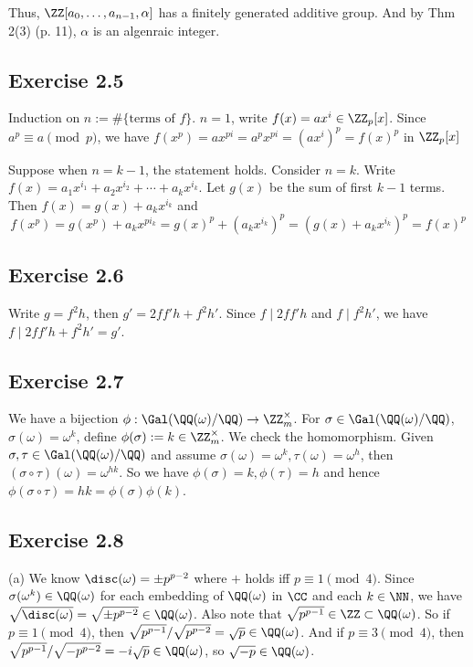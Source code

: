 \documentclass[../Chapter.tex]{subfiles}
\begin{document}
Thus, $\ZZ[a_0,\ldots,a_{n-1},\alpha]$ has a finitely generated additive group. And by Thm 2(3) (p. 11), $\alpha$ is an algenraic integer.  

\subsection*{Exercise 2.5}

Induction on $n:=\#\{\text{terms of }f\}$. $n=1$, write $f(x)=ax^i \in \ZZ_p[x]$. Since $a^p \equiv a \pmod{p}$, we have $f(x^p)=ax^{pi}=a^px^{pi}=(ax^i)^p=f(x)^p$ in $\ZZ_p[x]$

Suppose when $n=k-1$, the statement holds. Consider $n=k$. Write $f(x)=a_1x^{i_1}+a_2x^{i_2}+\cdots+a_kx^{i_k}$. Let $g(x)$ be the sum of first $k-1$ terms. Then $f(x)=g(x)+a_kx^{i_k}$ and $$f(x^p)=g(x^p)+a_kx^{pi_k}=g(x)^p+(a_kx^{i_k})^p=\left(g(x)+a_kx^{i_k}\right)^p=f(x)^p$$

\subsection*{Exercise 2.6}

Write $g=f^2h$, then $g'=2ff'h+f^2h'$. Since $f\mid 2ff'h$ and $f\mid f^2h'$, we have $f\mid 2ff'h+f^2h'=g'$.

\subsection*{Exercise 2.7}

We have a bijection $\phi: \Gal(\QQ(\omega)/\QQ)\to\ZZ_m^{\times}$. For $\sigma\in \Gal(\QQ(\omega)/\QQ)$, $\sigma(\omega)=\omega^k$, define $\phi(\sigma):=k\in\ZZ_m^{\times}$. We check the homomorphism. Given $\sigma,\tau\in\Gal(\QQ(\omega)/\QQ)$ and assume $\sigma(\omega)=\omega^k,\tau(\omega)=\omega^h$, then $(\sigma\circ\tau)(\omega)=\omega^{hk}$. So we have $\phi(\sigma)=k, \phi(\tau)=h$ and hence $\phi(\sigma\circ\tau)=hk=\phi(\sigma)\phi(k)$.

\subsection*{Exercise 2.8}

(a) We know
$\disc(\omega)=\pm p^{p-2}$ where $+$ holds iff $p\equiv 1 \pmod{4}$. Since $\sigma(\omega^k)\in\QQ(\omega)$ for each embedding of $\QQ(\omega)$ in $\CC$ and each $k\in\NN$, we have $\sqrt{\disc(\omega)}=\sqrt{\pm p^{p-2}} \in \QQ(\omega)$. Also note that $\sqrt{p^{p-1}} \in \ZZ \subset \QQ(\omega)$. So if $p\equiv 1 \pmod{4}$, then $\sqrt{p^{p-1}}/\sqrt{p^{p-2}} = \sqrt{p} \in \QQ(\omega)$. And if $p\equiv 3 \pmod{4}$, then $\sqrt{p^{p-1}}/\sqrt{-p^{p-2}} = -i\sqrt{p} \in \QQ(\omega)$, so $\sqrt{-p}\in\QQ(\omega)$.
\end{document}
